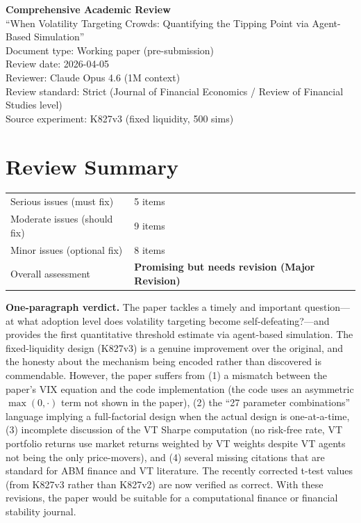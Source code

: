 \documentclass[12pt,a4paper]{article}
\begin{document}
\begin{center}
{\Large\bfseries Comprehensive Academic Review}\\[0.5em]
{\large ``When Volatility Targeting Crowds: Quantifying the Tipping Point via Agent-Based Simulation''}\\[0.5em]
{\normalsize Document type: Working paper (pre-submission)}\\
{\normalsize Review date: 2026-04-05}\\
{\normalsize Reviewer: Claude Opus 4.6 (1M context)}\\
{\normalsize Review standard: Strict (Journal of Financial Economics / Review of Financial Studies level)}\\
{\normalsize Source experiment: K827v3 (fixed liquidity, 500 sims)}
\end{center}

\vspace{1em}

\section*{Review Summary}

\begin{tabular}{ll}
\textcolor{errorred}{Serious issues (must fix)} & 5 items \\
\textcolor{warncolor}{Moderate issues (should fix)} & 9 items \\
Minor issues (optional fix) & 8 items \\
Overall assessment & \textbf{Promising but needs revision (Major Revision)} \\
\end{tabular}

\medskip

\noindent\textbf{One-paragraph verdict.}
The paper tackles a timely and important question---at what adoption level does volatility targeting become self-defeating?---and provides the first quantitative threshold estimate via agent-based simulation. The fixed-liquidity design (K827v3) is a genuine improvement over the original, and the honesty about the mechanism being encoded rather than discovered is commendable. However, the paper suffers from (1) a mismatch between the paper's VIX equation and the code implementation (the code uses an asymmetric $\max(0,\cdot)$ term not shown in the paper), (2) the ``27 parameter combinations'' language implying a full-factorial design when the actual design is one-at-a-time, (3) incomplete discussion of the VT Sharpe computation (no risk-free rate, VT portfolio returns use market returns weighted by VT weights despite VT agents not being the only price-movers), and (4) several missing citations that are standard for ABM finance and VT literature. The recently corrected t-test values (from K827v3 rather than K827v2) are now verified as correct. With these revisions, the paper would be suitable for a computational finance or financial stability journal.
\end{document}

